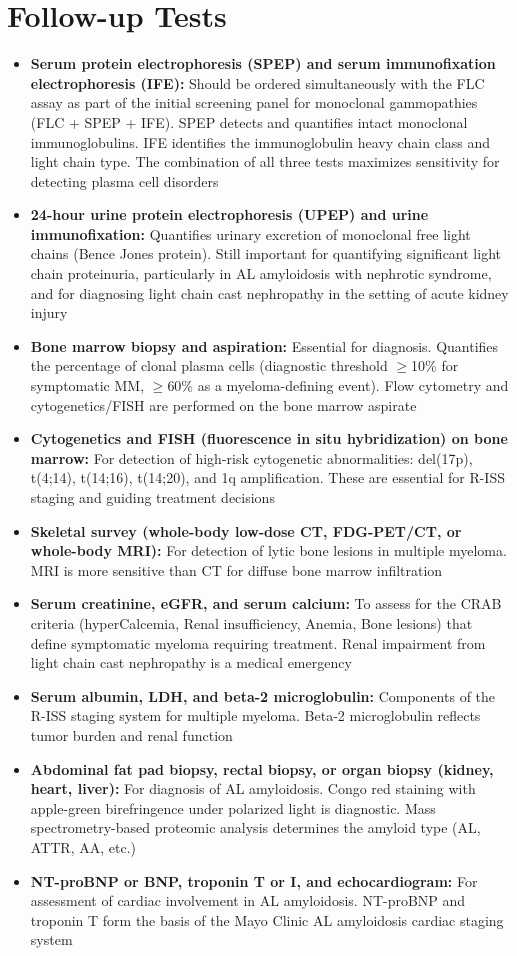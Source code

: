 \section*{Follow-up Tests}
\begin{itemize}
  \item \textbf{Serum protein electrophoresis (SPEP) and serum immunofixation electrophoresis (IFE):} Should be ordered simultaneously with the FLC assay as part of the initial screening panel for monoclonal gammopathies (FLC + SPEP + IFE). SPEP detects and quantifies intact monoclonal immunoglobulins. IFE identifies the immunoglobulin heavy chain class and light chain type. The combination of all three tests maximizes sensitivity for detecting plasma cell disorders
  \item \textbf{24-hour urine protein electrophoresis (UPEP) and urine immunofixation:} Quantifies urinary excretion of monoclonal free light chains (Bence Jones protein). Still important for quantifying significant light chain proteinuria, particularly in AL amyloidosis with nephrotic syndrome, and for diagnosing light chain cast nephropathy in the setting of acute kidney injury \cite{dejoie2016serum}
  \item \textbf{Bone marrow biopsy and aspiration:} Essential for diagnosis. Quantifies the percentage of clonal plasma cells (diagnostic threshold $\geq$10\% for symptomatic MM, $\geq$60\% as a myeloma-defining event). Flow cytometry and cytogenetics/FISH are performed on the bone marrow aspirate
  \item \textbf{Cytogenetics and FISH (fluorescence in situ hybridization) on bone marrow:} For detection of high-risk cytogenetic abnormalities: del(17p), t(4;14), t(14;16), t(14;20), and 1q amplification. These are essential for R-ISS staging and guiding treatment decisions
  \item \textbf{Skeletal survey (whole-body low-dose CT, FDG-PET/CT, or whole-body MRI):} For detection of lytic bone lesions in multiple myeloma. MRI is more sensitive than CT for diffuse bone marrow infiltration
  \item \textbf{Serum creatinine, eGFR, and serum calcium:} To assess for the CRAB criteria (hyperCalcemia, Renal insufficiency, Anemia, Bone lesions) that define symptomatic myeloma requiring treatment. Renal impairment from light chain cast nephropathy is a medical emergency
  \item \textbf{Serum albumin, LDH, and beta-2 microglobulin:} Components of the R-ISS staging system for multiple myeloma. Beta-2 microglobulin reflects tumor burden and renal function
  \item \textbf{Abdominal fat pad biopsy, rectal biopsy, or organ biopsy (kidney, heart, liver):} For diagnosis of AL amyloidosis. Congo red staining with apple-green birefringence under polarized light is diagnostic. Mass spectrometry-based proteomic analysis determines the amyloid type (AL, ATTR, AA, etc.)
  \item \textbf{NT-proBNP or BNP, troponin T or I, and echocardiogram:} For assessment of cardiac involvement in AL amyloidosis. NT-proBNP and troponin T form the basis of the Mayo Clinic AL amyloidosis cardiac staging system
\end{itemize}


